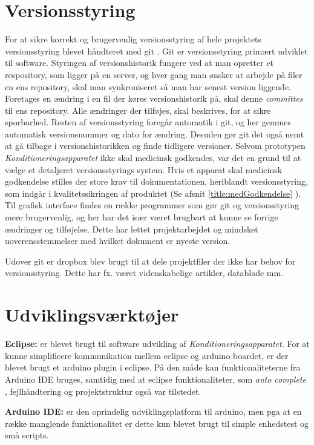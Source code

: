 \section{Versionsstyring} \label{title:versionsstyring}
For at sikre korrekt og brugervenlig versionsstyring af hele projektets versionsstyring blevet håndteret med git . Git er versionsstyring primært udviklet til software. Styringen af versionshistorik fungere ved at man opretter et respository, som ligger på en server, og hver gang man ønsker at arbejde på filer en ens repository, skal man synkroniseret så man har senest version liggende. Foretages en ændring i en fil der køres versionshistorik på, skal denne \textit{committes} til ens repository. Alle ændringer der tilføjes, skal beskrives, for at sikre sporbarhed. Resten af versionsstyring foregår automatik i git, og her gemmes automatisk versionsnummer og dato for ændring. Desuden gør git det også nemt at gå tilbage i versionshistorikken og finde tidligere versioner. 
Selvom prototypen \textit{Konditioneringsapparatet} ikke skal medicinsk godkendes, var det en grund til at vælge et detaljeret versionsstyrings system. Hvis et apparat skal medicinsk godkendelse stilles der store krav til dokumentationen, heriblandt versionsstyring, som indgår i kvalitetssikringen af produktet (Se afsnit \ref{title:medGodkendelse} ). 
Til grafisk interface findes en række programmer som gør git og versionsstyring mere brugervenlig, og her har det især været brugbart at kunne se forrige ændringer og tilføjelse. Dette har lettet projektarbejdet og mindsket uoverensstemmelser med hvilket dokument er nyeste version. 

Udover git er dropbox blev brugt til at dele projektfiler der ikke har behov for versionsstyring. Dette har fx. været videnskabelige artikler, datablade mm. 

\section{Udviklingsværktøjer}
\textbf{Eclipse:} er blevet brugt til software udvikling af \textit{Konditioneringsapparatet}. For at kunne simplificere kommunikation mellem eclipse og arduino boardet, er der blevet brugt et arduino plugin i eclipse. På den måde kan funktionaliteterne fra Arduino IDE bruges, samtidig med at eclipse funktionaliteter, som \textit{auto complete }, fejlhåndtering og projektstruktur også var tilstedet. 

\textbf{Arduino IDE:} er den oprindelig udviklingsplatform til arduino, men pga at en række manglende funktionalitet er dette kun blevet brugt til simple enhedstest og små scripts. 

